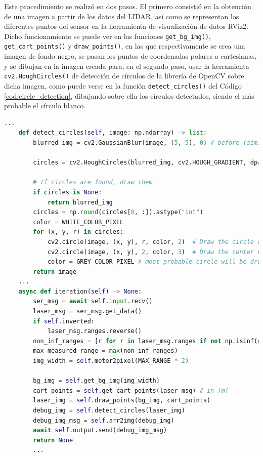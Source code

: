 Este procedimiento se realizó en dos pasos.
El primero consistió en la obtención de una imagen a partir de los datos del
LIDAR, así como se representan los diferentes puntos del sensor en la
herramienta de visualización de datos RViz2.
Dicho funcionamiento se puede ver en las funciones \verb|get_bg_img()|,
\verb|get_cart_points()| y \verb|draw_points()|, en las que respectivamente se
crea una imagen de fondo negro, se pasan los puntos de coordenadas polares a
cartesianas, y se dibujan en la imagen creada para, en el segundo paso, usar la
herramienta \verb|cv2.HoughCircles()| de detección de círculos de la librería de
OpenCV sobre dicha imagen, como puede verse en la función
\verb|detect_circles()| del Código \ref{cod:circle_detection}, dibujando sobre
ella los círculos detectados, siendo el más probable el círculo blanco.
\\

\begin{code}[h!]
  \begin{lstlisting}[language=Python]
    ...
    def detect_circles(self, image: np.ndarray) -> list:
        blurred_img = cv2.GaussianBlur(image, (5, 5), 0) # before (sim) :image, (5, 5), 2

        circles = cv2.HoughCircles(blurred_img, cv2.HOUGH_GRADIENT, dp=1, minDist=40, param1=30, param2=25, minRadius=10, maxRadius=100)

        # If circles are found, draw them
        if circles is None:
            return blurred_img
        circles = np.round(circles[0, :]).astype("int")
        color = WHITE_COLOR_PIXEL
        for (x, y, r) in circles:
            cv2.circle(image, (x, y), r, color, 2)  # Draw the circle outline
            cv2.circle(image, (x, y), 2, color, 3)  # Draw the center of the circle
            color = GREY_COLOR_PIXEL # most probable circle will be drawn in white
        return image
    ...
    async def iteration(self) -> None:
        ser_msg = await self.input.recv()
        laser_msg = ser_msg.get_data()
        if self.inverted:
            laser_msg.ranges.reverse()
        non_inf_ranges = [r for r in laser_msg.ranges if not np.isinf(r)]
        max_measured_range = max(non_inf_ranges)
        img_width = self.meter2pixel(MAX_RANGE * 2)

        bg_img = self.get_bg_img(img_width)
        cart_points = self.get_cart_points(laser_msg) # in [m]
        laser_img = self.draw_points(bg_img, cart_points)
        debug_img = self.detect_circles(laser_img)
        debug_img_msg = self.arr2img(debug_img)
        await self.output.send(debug_img_msg)
        return None
        ...
  \end{lstlisting}
\caption[Funciones de detección de círculos de un nodo de Zenoh-Flow]{Funciones de detección de círculos de un nodo de Zenoh-Flow}
\label{cod:circle_detection}
\end{code}

